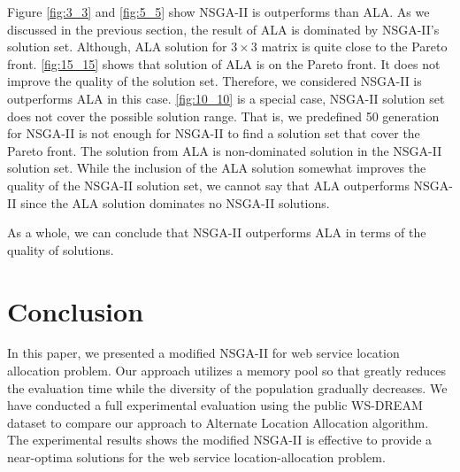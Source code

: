 \documentclass[twoside]{article}
\begin{document}
Figure \ref{fig:3_3} and \ref{fig:5_5} show NSGA-II is outperforms than ALA. As we discussed in the previous section, the 
result of ALA is dominated by NSGA-II's solution set. Although, ALA solution for $3 \times 3$ matrix is quite close to the 
Pareto front. \ref{fig:15_15} shows that solution of ALA is on the Pareto front. It does not improve the quality of the solution
set. Therefore, we considered NSGA-II is outperforms ALA in this case. \ref{fig:10_10} is a special case, NSGA-II solution set does
not cover the possible solution range. That is, we predefined 50 generation for NSGA-II is not enough for NSGA-II to find a solution
set that cover the Pareto front. The solution from ALA is non-dominated solution in the NSGA-II solution set. While the inclusion
of the ALA solution somewhat improves the quality of the NSGA-II solution set, we cannot say that ALA outperforms NSGA-II since the 
ALA solution dominates no NSGA-II solutions.

As a whole, we can conclude that NSGA-II outperforms ALA in terms of the quality of solutions.


\section{Conclusion}
In this paper, we presented a modified NSGA-II for web service location allocation problem. Our approach utilizes a memory pool so that
greatly reduces the evaluation time while the diversity of the population gradually decreases. We have conducted a full experimental evaluation using the public WS-DREAM dataset to compare our approach to Alternate Location Allocation algorithm. 
The experimental results shows the modified NSGA-II is effective to provide a near-optima solutions for the web service location-allocation problem.



\end{document}
